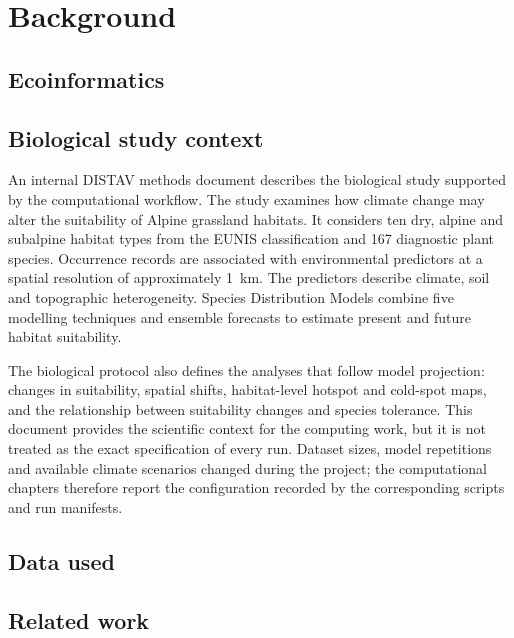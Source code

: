 \chapter{Background}


\section{Ecoinformatics}

\section{Biological study context}

An internal DISTAV methods document describes the biological study supported by the computational workflow. The study examines how climate change may alter the suitability of Alpine grassland habitats. It considers ten dry, alpine and subalpine habitat types from the EUNIS classification and 167 diagnostic plant species. Occurrence records are associated with environmental predictors at a spatial resolution of approximately 1~km. The predictors describe climate, soil and topographic heterogeneity. Species Distribution Models combine five modelling techniques and ensemble forecasts to estimate present and future habitat suitability.

The biological protocol also defines the analyses that follow model projection: changes in suitability, spatial shifts, habitat-level hotspot and cold-spot maps, and the relationship between suitability changes and species tolerance. This document provides the scientific context for the computing work, but it is not treated as the exact specification of every run. Dataset sizes, model repetitions and available climate scenarios changed during the project; the computational chapters therefore report the configuration recorded by the corresponding scripts and run manifests.

\section{Data used}

\section{Related work}
